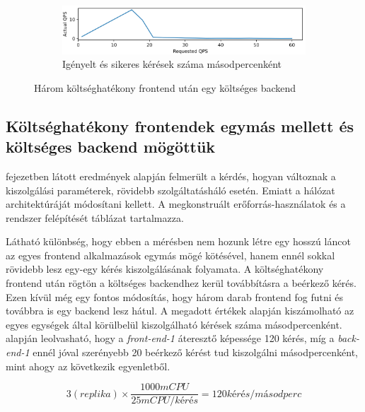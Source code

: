 \begin{figure}
\hfill
\begin{subfigure}{\textwidth}
    \includegraphics[width=\textwidth]{figures/3FE-1BE-chain/actual-qps.png}
    \caption{Igényelt és sikeres kérések száma másodpercenként}
    \label{subfig:actual-qps}
\end{subfigure}
        
\caption{Három költséghatékony frontend után egy költséges backend}
\label{fig:3FE_1BE_chain}
\end{figure}

\subsection{Költséghatékony frontendek egymás mellett és költséges backend mögöttük}
\label{subsec:3FE_1BE_stack}
 fejezetben látott eredmények alapján felmerült a kérdés, hogyan változnak a kiszolgálási paraméterek, rövidebb szolgáltatásháló esetén. 
Emiatt a hálózat architektúráját módosítani kellett.
A megkonstruált erőforrás-használatok és a rendszer felépítését  táblázat tartalmazza. 

Látható különbség, hogy ebben a mérésben nem hozunk létre egy hosszú láncot az egyes frontend alkalmazások egymás mögé kötésével, hanem ennél sokkal rövidebb lesz egy-egy kérés kiszolgálásának folyamata. 
A költséghatékony frontend után rögtön a költséges backendhez kerül továbbításra a beérkező kérés.
Ezen kívül még egy fontos módosítás, hogy három darab frontend fog futni és továbbra is egy backend lesz hátul.
A megadott értékek alapján kiszámolható az egyes egységek által körülbelül kiszolgálható kérések száma másodpercenként.
 alapján leolvasható, hogy a \textit{front-end-1} áteresztő képessége 120 kérés, míg a \textit{back-end-1} ennél jóval szerényebb 20 beérkező kérést tud kiszolgálni másodpercenként, mint ahogy az következik  egyenletből.

\begin{equation}
\label{eq:3FEsumqps}
3(replika)\times\frac{1000 mCPU}{25 mCPU/kérés} = 120 kérés/másodperc
\end{equation}

